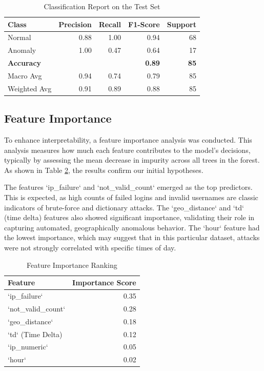 \documentclass[conference]{IEEEtran}
\begin{document}
\begin{table}[t]
\caption{Classification Report on the Test Set}
\label{tab:test_report}
\centering
\begin{tabular}{lrrrr}
\toprule
\textbf{Class} & \textbf{Precision} & \textbf{Recall} & \textbf{F1-Score} & \textbf{Support} \\
\midrule
Normal & 0.88 & 1.00 & 0.94 & 68 \\
Anomaly & 1.00 & 0.47 & 0.64 & 17 \\
\midrule
\textbf{Accuracy} & & & \textbf{0.89} & \textbf{85} \\
Macro Avg & 0.94 & 0.74 & 0.79 & 85 \\
Weighted Avg & 0.91 & 0.89 & 0.88 & 85 \\
\bottomrule
\end{tabular}
\end{table}

\subsection{Feature Importance}
To enhance interpretability, a feature importance analysis was conducted. This analysis measures how much each feature contributes to the model's decisions, typically by assessing the mean decrease in impurity across all trees in the forest. As shown in Table \ref{tab:feature_importance}, the results confirm our initial hypotheses.

The features `ip_failure` and `not_valid_count` emerged as the top predictors. This is expected, as high counts of failed logins and invalid usernames are classic indicators of brute-force and dictionary attacks. The `geo_distance` and `td` (time delta) features also showed significant importance, validating their role in capturing automated, geographically anomalous behavior. The `hour` feature had the lowest importance, which may suggest that in this particular dataset, attacks were not strongly correlated with specific times of day.

\begin{table}[t]
\caption{Feature Importance Ranking}
\label{tab:feature_importance}
\centering
\begin{tabular}{lr}
\toprule
\textbf{Feature} & \textbf{Importance Score} \\
\midrule
`ip_failure` & 0.35 \\
`not_valid_count` & 0.28 \\
`geo_distance` & 0.18 \\
`td` (Time Delta) & 0.12 \\
`ip_numeric` & 0.05 \\
`hour` & 0.02 \\
\bottomrule
\end{tabular}
\end{table}
\end{document}
